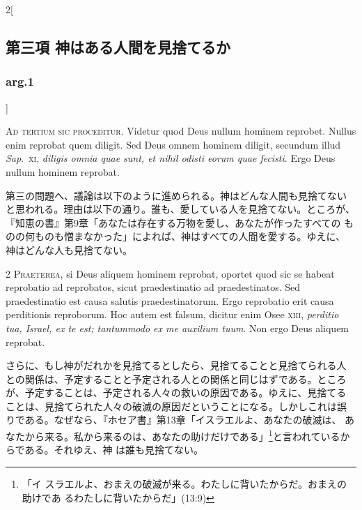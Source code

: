 \documentclass[paper=a4paper,fontsize=10pt,jafontsize=9pt,titlepage]{jlreq}
\begin{document}


\begin{paracol}{2}[\subsection{第三項 神はある人間を見捨てるか}\subsubsection{arg.1}]

{\Huge A}{\scshape d tertium sic proceditur}. Videtur quod
Deus nullum hominem reprobet. Nullus enim reprobat quem diligit. Sed
Deus omnem hominem diligit, secundum illud {\itshape Sap}.~{\scshape xi}, {\itshape diligis omnia quae
sunt, et nihil odisti eorum quae fecisti}. Ergo Deus nullum hominem
reprobat.


\switchcolumn


第三の問題へ、議論は以下のように進められる。神はどんな人間も見捨てない
と思われる。理由は以下の通り。誰も、愛している人を見捨てない。ところが、
『知恵の書』第9章「あなたは存在する万物を愛し、あなたが作ったすべての
ものの何ものも憎まなかった」によれば、神はすべての人間を愛する。ゆえに、
神はどんな人も見捨てない。




{\scshape 2 Praeterea}, si Deus aliquem hominem
reprobat, oportet quod sic se habeat reprobatio ad reprobatos, sicut
praedestinatio ad praedestinatos. Sed praedestinatio est causa salutis
praedestinatorum. Ergo reprobatio erit causa perditionis reproborum. Hoc
autem est falsum, dicitur enim Osee {\scshape xiii}, {\itshape perditio tua, Israel, ex te
 est; tantummodo ex me auxilium tuum}. Non ergo Deus aliquem reprobat.


\switchcolumn


さらに、もし神がだれかを見捨てるとしたら、見捨てることと見捨てられる人
との関係は、予定することと予定される人との関係と同じはずである。ところ
が、予定することは、予定される人々の救いの原因である。ゆえに、見捨てる
ことは、見捨てられた人々の破滅の原因だということになる。しかしこれは誤
りである。なぜなら、『ホセア書』第13章「イスラエルよ、あなたの破滅は、
あなたから来る。私から来るのは、あなたの助けだけである」\footnote{「イ
スラエルよ、おまえの破滅が来る。わたしに背いたからだ。おまえの助けであ
るわたしに背いたからだ」(13:9)}と言われているからである。それゆえ、神
は誰も見捨てない。



\end{paracol}
\end{document}
